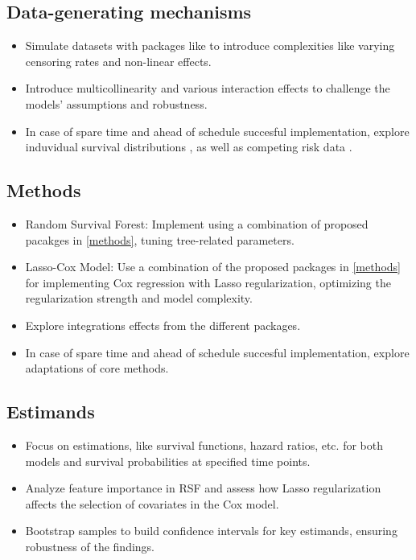 \subsection{Data-generating mechanisms}
\begin{itemize}
\item Simulate datasets with packages like \parencite{davidson-pilon_lifelines_2024} to introduce complexities like varying censoring rates and non-linear effects.
\item Introduce multicollinearity and various interaction effects to challenge the models' assumptions and robustness.
\item In case of spare time and ahead of schedule succesful implementation, explore induvidual survival distributions \parencite{haider_effective_2018}, as well as competing risk data \parencite{meng_simulating_2023}.
\end{itemize}

\subsection{Methods}
\begin{itemize}
\item Random Survival Forest: Implement using a combination of proposed pacakges in \ref{methods}, tuning tree-related parameters.
\item Lasso-Cox Model: Use a combination of the proposed packages in \ref{methods} for implementing Cox regression with Lasso regularization, optimizing the regularization strength and model complexity. 
\item Explore integrations effects from the different packages.
\item In case of spare time and ahead of schedule succesful implementation, explore adaptations of core methods.
\end{itemize}

\subsection{Estimands}
\begin{itemize}
\item Focus on estimations, like survival functions, hazard ratios, etc. for both models and survival probabilities at specified time points.
\item Analyze feature importance in RSF and assess how Lasso regularization affects the selection of covariates in the Cox model.
\item Bootstrap samples to build confidence intervals for key estimands, ensuring robustness of the findings.
\end{itemize}

